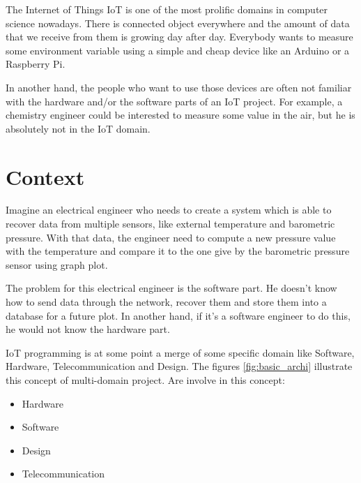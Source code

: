 \label{cha:introduction}

The Internet of Things \gls{IoT} is one of the most prolific domains in computer science
nowadays. There is connected object everywhere and the amount of data that we
receive from them is growing day after day. Everybody wants to measure some
environment variable using a simple and cheap device like an Arduino or a
Raspberry Pi.

In another hand, the people who want to use those devices are often not familiar
with the hardware and/or the software parts of an IoT project. For example, a
chemistry engineer could be interested to measure some value in the air, but he
is absolutely not in the IoT domain.

\section{Context}
\label{sec:intro-context}

Imagine an electrical engineer who needs to create a system which is able to
recover data from multiple sensors, like external temperature and barometric
pressure. With that data, the engineer need to compute a new pressure value
with the temperature and compare it to the one give by the barometric pressure
sensor using graph plot.

The problem for this electrical engineer is the software part. He doesn't know how
to send data through the network, recover them and store them into a database
for a future plot. In another hand, if it's a software engineer to do this, he
would not know the hardware part.

IoT programming is at some point a merge of some specific domain like Software,
Hardware, Telecommunication and Design. The figures \ref{fig:basic_archi} illustrate
this concept of multi-domain project. Are involve in this concept:

\begin{itemize}
\item Hardware
\item Software
\item Design
\item Telecommunication
\end{itemize}

